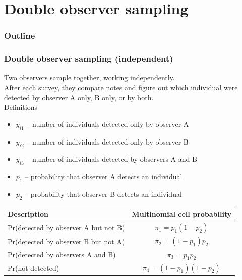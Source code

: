 \documentclass[color=usenames,dvipsnames]{beamer}\usepackage[]{graphicx}\usepackage[]{color}
\begin{document}
\section{Double observer sampling}

\begin{frame}
  \frametitle{Outline}
  \Large
\end{frame}




\begin{frame}
  \frametitle{Double observer sampling (independent)}
  \small
  Two observers sample together, working independently. \\
  \pause
  \vfill
  After each survey, they compare notes and figure out which
  individual were detected by observer A only, B only, or by both. \\
  \pause
  \vfill
  Definitions
  \begin{itemize}
    \setlength\itemsep{1pt}
    \item $y_{i1}$ -- number of individuals detected only by observer A
    \item $y_{i2}$ -- number of individuals detected only by observer B
    \item $y_{i3}$ -- number of individuals detected by observers A and B
    \item $p_1$ -- probability that observer A detects an individual 
    \item $p_2$ -- probability that observer B detects an individual 
  \end{itemize}
  \pause \vfill
  \footnotesize
  \begin{tabular}{lc}
    \hline
    \centering
    Description & Multinomial cell probability \\
    \hline
    Pr(detected by observer A but not B) & $\pi_1 = p_1(1-p_2)$ \\
    Pr(detected by observer B but not A) & $\pi_2 = (1-p_1)p_2$ \\
    Pr(detected by observers A and B) & $\pi_3 = p_1p_2$ \\
    Pr(not detected) & $\pi_4 = (1-p_1)(1-p_2)$ \\
    \hline
  \end{tabular}
\end{frame}
\end{document}
